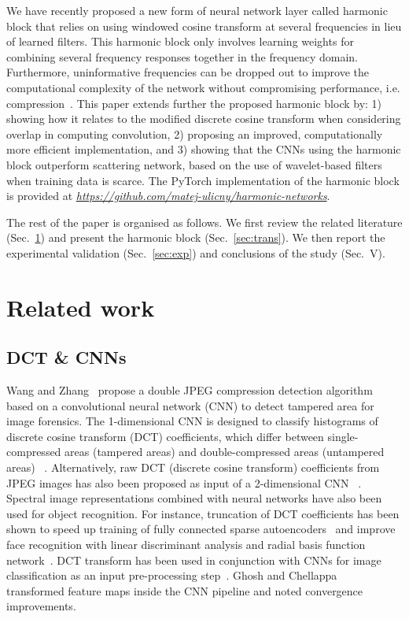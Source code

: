\documentclass[conference]{IEEEtran}
\begin{document}
We have recently proposed a new form of neural network layer called harmonic block \cite{Ulicny18} that relies on using windowed cosine transform at several frequencies in lieu of learned filters. This harmonic block only involves learning weights for combining several frequency responses together in the frequency domain. Furthermore, uninformative frequencies can be dropped out to improve the computational complexity of the network without compromising performance, i.e. compression~\cite{Ulicny18}. 
This paper extends further the proposed harmonic block by: 1) showing how it relates to the modified discrete cosine transform when considering overlap in computing convolution, 2) proposing an improved, computationally more efficient implementation, and 3) showing that the CNNs using the harmonic block outperform scattering network, based on the use of wavelet-based filters~\cite{Bruna13,Oyallon18} when training data is scarce. The PyTorch implementation of the harmonic block is provided at \textit{\url{https://github.com/matej-ulicny/harmonic-networks}}.

The rest of the paper is organised as follows. We first review the related literature (Sec.~\ref{sec:rel_work}) and present the harmonic block (Sec.~\ref{sec:trans}). We then report the experimental validation (Sec.~\ref{sec:exp}) and conclusions of the study (Sec.~V). 

\section{Related work}
\label{sec:rel_work}


\subsection{DCT \& CNNs}

Wang and Zhang~\cite{Wang16} propose a double JPEG
compression detection algorithm based on a convolutional neural network (CNN) to detect tampered area for  image forensics. The 1-dimensional CNN is designed to classify histograms of discrete cosine transform (DCT) coefficients, which differ between single-compressed areas (tampered areas) and double-compressed areas (untampered areas) ~\cite{Wang16,Amerini17,Barni17}. Alternatively, raw DCT (discrete cosine transform) coefficients from JPEG images has also been proposed as input of a  2-dimensional CNN ~\cite{Li17}.
Spectral image representations combined with neural networks have also been used for object recognition. For instance, truncation of DCT coefficients has been shown to speed up training of fully connected sparse autoencoders~\cite{Zou14} and improve face recognition with linear discriminant analysis and radial basis function network~\cite{Er05}. DCT transform has been used in conjunction with CNNs for image classification as an input pre-processing step~\cite{Ulicny17,Gueguen18}. Ghosh and Chellappa~\cite{Ghosh16} transformed feature maps inside the CNN pipeline and noted convergence improvements. 
\end{document}
